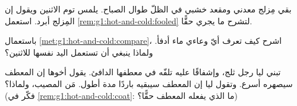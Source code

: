 \begin{exercise}[$\star$]\label{exo:g1:hot-and-cold:7}
بقي مِزلج معدني ومقعد خشبي في الظلّ طوال الصباح. يلمس توم
الاثنين ويقول إن المِزلج أبرد. استعمل
\cref{rem:g1:hot-and-cold:fooled} لتشرح ما يجري حقًّا.
\end{exercise}

\begin{exercise}[$\star$]\label{exo:g1:hot-and-cold:8}
باستعمال \cref{met:g1:hot-and-cold:compare}، اشرح كيف تعرف أيّ
وعاءي ماء أدفأ. ولماذا ينبغي أن تستعمل اليد نفسها للاثنين؟
\end{exercise}

\begin{exercise}[$\star\star$]\label{exo:g1:hot-and-cold:9}
تبني ليا رجل ثلج، وإشفاقًا عليه تلفّه في معطفها الدافئ. يقول
أخوها إن المعطف سيصهره أسرع. وتقول ليا إن المعطف سيبقيه باردًا
مدة أطول. مَن المصيب، ولماذا؟ (فكّر في
\cref{rem:g1:hot-and-cold:coat}: ما الذي يفعله المعطف حقًّا؟)
\end{exercise}
